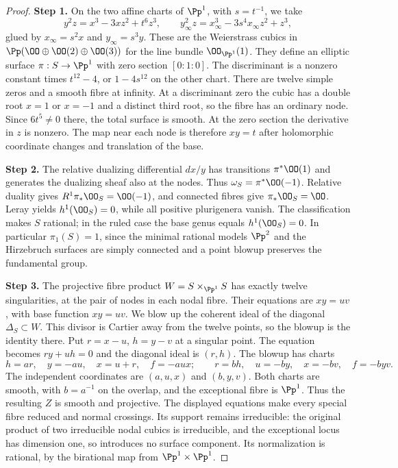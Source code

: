 \begin{proof}
\noindent\textbf{Step 1.} On the two affine charts of $\Pp^1$, with $s=t^{-1}$, we take
\[
 y^2z=x^3-3xz^2+t^6z^3,\qquad
 y_\infty^2z=x_\infty^3-3s^4x_\infty z^2+z^3,
\]
glued by $x_\infty=s^2x$ and $y_\infty=s^3y$. These are the
Weierstrass cubics in $\Pp(\OO\oplus\OO(2)\oplus\OO(3))$ for
the line bundle $\OO_{\Pp^1}(1)$. They define an elliptic surface
$\pi:S\to\Pp^1$ with zero section $[0:1:0]$. The discriminant
is a nonzero constant times $t^{12}-4$, or $1-4s^{12}$ on the
other chart. There are twelve simple zeros and a smooth fibre at
infinity. At a discriminant zero the cubic has a double root
$x=1$ or $x=-1$ and a distinct third root, so the fibre has an
ordinary node. Since $6t^5\ne0$ there, the total surface is smooth.
At the zero section the derivative in $z$ is nonzero. The map near
each node is therefore $xy=t$ after holomorphic coordinate changes
and translation of the base.

\noindent\textbf{Step 2.} The relative dualizing differential $dx/y$ has transitions
$\pi^*\OO(1)$ and generates the dualizing sheaf also at the nodes.
Thus $\omega_S=\pi^*\OO(-1)$. Relative duality gives
$R^1\pi_*\OO_S=\OO(-1)$, and connected fibres give
$\pi_*\OO_S=\OO$. Leray yields $h^1(\OO_S)=0$, while all
positive plurigenera vanish. The classification \cite[Chapter~VI, Theorem~1.1, p.~243]{BHPV2004E} makes $S$
rational; in the ruled case the base genus equals $h^1(\OO_S)=0$.
In particular $\pi_1(S)=1$, since the minimal rational models
$\Pp^2$ and the Hirzebruch surfaces are simply connected and a
point blowup preserves the fundamental group.

\noindent\textbf{Step 3.} The projective fibre product $W=S\times_{\Pp^1}S$ has exactly
twelve singularities, at the pair of nodes in each nodal fibre.
Their equations are $xy=uv$, with base function $xy=uv$. We blow
up the coherent ideal of the diagonal $\Delta_S\subset W$. This
divisor is Cartier away from the twelve points, so the blowup is
the identity there. Put $r=x-u$, $h=y-v$ at a singular point.
The equation becomes $ry+uh=0$ and the diagonal ideal is $(r,h)$.
The blowup has charts
\[
 h=ar,\quad y=-au,\quad x=u+r,\quad f=-aux;
 \qquad
 r=bh,\quad u=-by,\quad x=-bv,\quad f=-byv.
\]
The independent coordinates are $(a,u,x)$ and $(b,y,v)$.
Both charts are smooth, with $b=a^{-1}$ on the overlap, and the
exceptional fibre is $\Pp^1$. Thus the resulting $Z$ is smooth
and projective. The displayed equations make every special fibre
reduced and normal crossings. Its support remains irreducible:
the original product of two irreducible nodal cubics is irreducible,
and the exceptional locus has dimension one, so introduces no
surface component. Its normalization is rational, by the
birational map from $\Pp^1\times\Pp^1$.


\end{proof}
